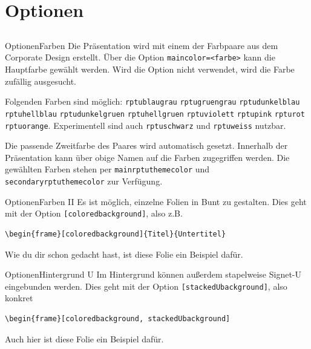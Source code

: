 \documentclass[german,10pt,compress]{beamer}
\begin{document}
\section{Optionen}
\subsection*{}
\newcommand{\farbe}[1]{{\color{#1}\lstinline|#1|}}
\begin{frame}{Optionen}{Farben}
	Die Präsentation wird mit einem der Farbpaare aus dem Corporate Design erstellt. Über die Option \lstinline!maincolor=<farbe>! kann die Hauptfarbe gewählt werden. Wird die Option nicht verwendet, wird die Farbe zufällig ausgesucht. \par
	Folgenden Farben sind möglich:
	\farbe{rptublaugrau} \farbe{rptugruengrau} \farbe{rptudunkelblau} \farbe{rptuhellblau}
	\farbe{rptudunkelgruen} \farbe{rptuhellgruen} \farbe{rptuviolett} \farbe{rptupink}
	\farbe{rpturot} \farbe{rptuorange}. Experimentell sind auch \farbe{rptuschwarz} und \color{black}\lstinline!rptuweiss! nutzbar.\par
	Die passende Zweitfarbe des Paares wird automatisch gesetzt. Innerhalb der Präsentation kann über obige Namen auf die Farben zugegriffen werden. Die gewählten Farben stehen per \farbe{mainrptuthemecolor} und \farbe{secondaryrptuthemecolor} zur Verfügung. \par
\end{frame}
\begin{frame}{Optionen}{Farben II}
	Es ist möglich, einzelne Folien in Bunt zu gestalten. Dies geht mit der Option \lstinline![coloredbackground]!, also z.B.
	\begin{lstlisting}
\begin{frame}[coloredbackground]{Titel}{Untertitel}
\end{lstlisting}
	Wie du dir schon gedacht hast, ist diese Folie ein Beispiel dafür.
\end{frame}
\begin{frame}{Optionen}{Hintergrund U}
	Im Hintergrund können außerdem stapelweise Signet-U eingebunden werden. Dies geht mit der Option \lstinline![stackedUbackground]!, also konkret
	\begin{lstlisting}
\begin{frame}[coloredbackground, stackedUbackground]
\end{lstlisting}
	Auch hier ist diese Folie ein Beispiel dafür.
\end{frame}
\end{document}
